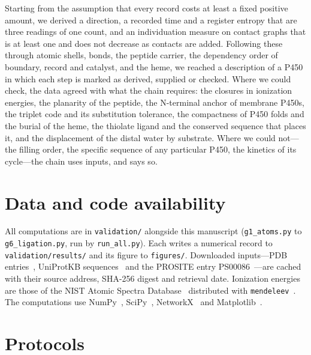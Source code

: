 \documentclass[10pt,twocolumn,a4paper]{article}
\begin{document}
Starting from the assumption that every record costs at least a fixed
positive amount, we derived a direction, a recorded time and a register
entropy that are three readings of one count, and an individuation measure
on contact graphs that is at least one and does not decrease as contacts are
added. Following these through atomic shells, bonds, the peptide carrier,
the dependency order of boundary, record and catalyst, and the heme, we
reached a description of a P450 in which each step is marked as derived,
supplied or checked. Where we could check, the data agreed with what the
chain requires: the closures in ionization energies, the planarity of the
peptide, the N-terminal anchor of membrane P450s, the triplet code and its
substitution tolerance, the compactness of P450 folds and the burial of the
heme, the thiolate ligand and the conserved sequence that places it, and the
displacement of the distal water by substrate. Where we could not---the
filling order, the specific sequence of any particular P450, the kinetics of
its cycle---the chain uses inputs, and says so.

\section*{Data and code availability}
\label{sec:data}

All computations are in \texttt{validation/} alongside this manuscript
(\texttt{g1\_atoms.py} to \texttt{g6\_ligation.py}, run by
\texttt{run\_all.py}). Each writes a numerical record to
\texttt{validation/results/} and its figure to \texttt{figures/}. Downloaded
inputs---PDB entries~\citep{berman2000}, UniProtKB
sequences~\citep{uniprot2023} and the PROSITE entry
PS00086~\citep{sigrist2013}---are cached with their source address, SHA-256
digest and retrieval date. Ionization energies are those of the NIST Atomic
Spectra Database~\citep{kramida2023} distributed with
\texttt{mendeleev}~\citep{mentel2014}. The computations use
NumPy~\citep{harris2020}, SciPy~\citep{virtanen2020},
NetworkX~\citep{hagberg2008} and Matplotlib~\citep{hunter2007}.

\appendix
\section{Protocols}
\label{app:protocols}
\end{document}
